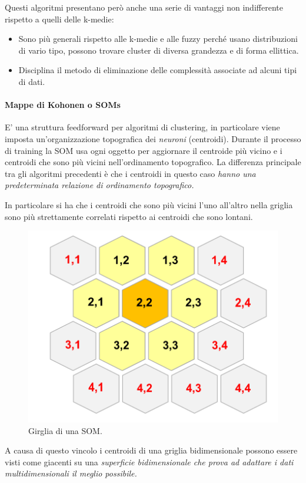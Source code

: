 Questi algoritmi presentano però anche una serie di vantaggi non indifferente rispetto a quelli delle k-medie:
\begin{itemize}
	\item Sono più generali rispetto alle k-medie e alle fuzzy perché usano distribuzioni di vario tipo, possono trovare cluster di diversa grandezza e di forma ellittica.
	\item Disciplina il metodo di eliminazione delle complessità associate ad alcuni tipi di dati.
\end{itemize}

\paragraph{Mappe di Kohonen o SOMs}
E' una struttura feedforward per algoritmi di clustering, in particolare viene imposta un'organizzazione topografica dei \textit{neuroni} (centroidi). Durante il processo di training la SOM usa ogni oggetto per aggiornare il centroide più vicino e i centroidi che sono più vicini nell'ordinamento topografico.
La differenza principale tra gli algoritmi precedenti è che i centroidi in questo caso \textit{hanno una predeterminata relazione di ordinamento topografico.}

In particolare si ha che i centroidi che sono più vicini l'uno all'altro nella griglia sono più strettamente correlati rispetto ai centroidi che sono lontani.
\begin{figure}[H]
	\centering
	\includegraphics[height=0.3 \linewidth]{clustering/pict/som.png}
	\caption{Girglia di una SOM.}
\end{figure}

A causa di questo vincolo i centroidi di una griglia bidimensionale possono essere visti come giacenti su una \textit{superficie bidimensionale che prova ad adattare i dati multidimensionali il meglio possibile.}

